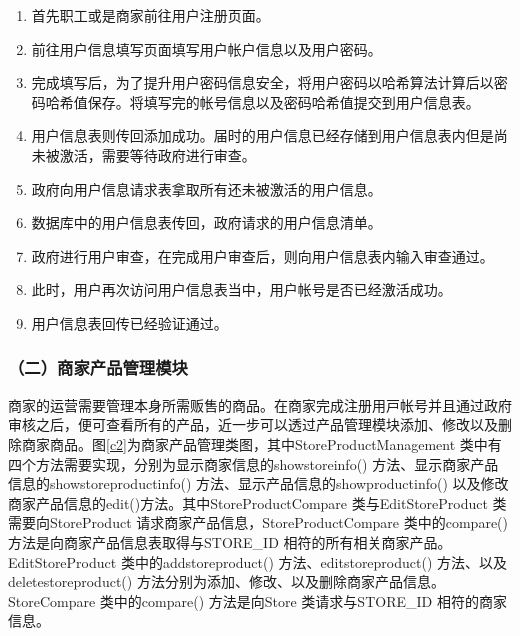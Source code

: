 	\begin{enumerate}
	\item 首先职工或是商家前往用户注册页面。
	\item 前往用户信息填写页面填写用户帐户信息以及用户密码。
	\item 完成填写后，为了提升用户密码信息安全，将用户密码以哈希算法计算后以密码哈希值保存。将填写完的帐号信息以及密码哈希值提交到用户信息表。
	\item 用户信息表则传回添加成功。届时的用户信息已经存储到用户信息表内但是尚未被激活，需要等待政府进行审查。
	\item 政府向用户信息请求表拿取所有还未被激活的用户信息。
	\item 数据库中的用户信息表传回，政府请求的用户信息清单。
	\item 政府进行用户审查，在完成用户审查后，则向用户信息表内输入审查通过。
	\item 此时，用户再次访问用户信息表当中，用户帐号是否已经激活成功。
	\item 用户信息表回传已经验证通过。
	\end{enumerate}


\subsubsection{（二）商家产品管理模块}
商家的运营需要管理本⾝所需贩售的商品。在商家完成注册⽤⼾帐号并且通过政府审核之后，便可查看所有的产品，近⼀步可以透过产品管理模块添加、修改以及删除商家商品。图\ref{c2}为商家产品管理类图，其中StoreProductManagement 类中有四个⽅法需要实现，分别为显⽰商家信息的showstoreinfo() ⽅法、显⽰商家产品信息的showstoreproductinfo() ⽅法、显⽰产品信息的showproductinfo() 以及修改商家产品信息的edit()⽅法。其中StoreProductCompare 类与EditStoreProduct 类需要向StoreProduct 请求商家产品信息，StoreProductCompare 类中的compare() ⽅法是向商家产品信息表取得与STORE\_ID 相符的所有相关商家产品。EditStoreProduct 类中的addstoreproduct() ⽅法、editstoreproduct() ⽅法、以及deletestoreproduct() ⽅法分别为添加、修改、以及删除商家产品信息。StoreCompare 类中的compare() ⽅法是向Store 类请求与STORE\_ID 相符的商家信息。

